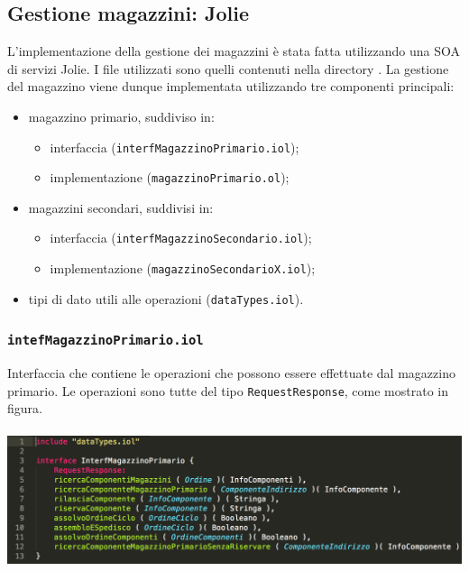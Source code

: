 \subsection{Gestione magazzini: Jolie}
L'implementazione della gestione dei magazzini \`e stata fatta
utilizzando una SOA di servizi Jolie. I file utilizzati sono quelli
contenuti nella directory .
La gestione del magazzino viene dunque implementata utilizzando tre
componenti principali: 
\begin{itemize}
  \item magazzino primario, suddiviso in:
    \begin{itemize}
      \item interfaccia ({\tt interfMagazzinoPrimario.iol});
      \item implementazione ({\tt magazzinoPrimario.ol});
    \end{itemize}
  \item magazzini secondari, suddivisi in:
    \begin{itemize}
      \item interfaccia ({\tt interfMagazzinoSecondario.iol});
      \item implementazione ({\tt magazzinoSecondarioX.iol});
    \end{itemize}
  \item tipi di dato utili alle operazioni ({\tt dataTypes.iol}).
\end{itemize}

\subsubsection*{\tt intefMagazzinoPrimario.iol}
Interfaccia che contiene le operazioni che possono essere effettuate dal
magazzino primario. Le operazioni sono tutte del tipo
{\tt RequestResponse}, come mostrato in figura. \\\\
\includegraphics[scale=0.4]{immagini/interfMagazzinoPrimario.png}

